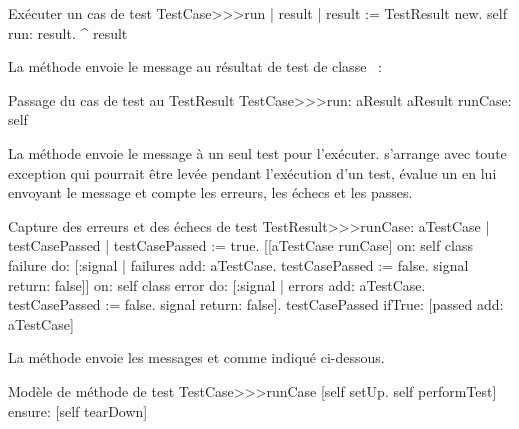 \documentclass[a4paper,10pt,twoside]{book}
\begin{document}
\begin{method}[tastecaserun]{Exécuter un cas de test}
TestCase>>>run
	| result |
	result := TestResult new.
	self run: result.
	^ result
\end{method}


La méthode  envoie le message  au résultat de test de classe ~:

\begin{method}[testcaserun:]{Passage du cas de test au TestResult}
TestCase>>>run: aResult
	aResult runCase: self
\end{method}
La méthode  envoie le message  à un seul test pour l'exécuter.
 s'arrange avec toute exception qui pourrait être levée pendant l'exécution d'un test, évalue un  en lui envoyant le message  et compte les erreurs, les échecs et les passes.

\begin{method}[testresultruncase]{Capture des erreurs et des échecs de test}
TestResult>>>runCase: aTestCase
	| testCasePassed |
	testCasePassed := true.
	[[aTestCase runCase] 
			on: self class failure
			do: 
				[:signal | 
				failures add: aTestCase.
				testCasePassed := false.
				signal return: false]]
					on: self class error
					do:
						[:signal |
						errors add: aTestCase.
						testCasePassed := false.
						signal return: false].
	testCasePassed ifTrue: [passed add: aTestCase]
\end{method}

La méthode  envoie les messages
 et  comme indiqué
ci-dessous.
\begin{method}[testcaseruncase]{Modèle de méthode de test}
TestCase>>>runCase
	[self setUp.
	self performTest] ensure: [self tearDown]
\end{method} %


\end{document}
